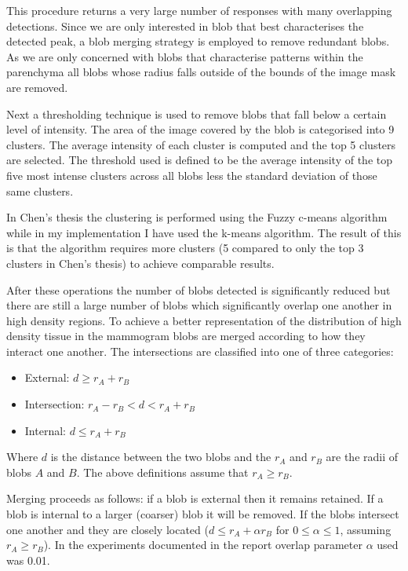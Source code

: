This procedure returns a very large number of responses with many overlapping detections. Since we are only interested in blob that best characterises the detected peak, a blob merging strategy is employed to remove redundant blobs. As we are only concerned with blobs that characterise patterns within the parenchyma all blobs whose radius falls outside of the bounds of the image mask are removed. 

Next a thresholding technique is used to remove blobs that fall below a certain level of intensity. The area of the image covered by the blob is categorised into 9 clusters. The average intensity of each cluster is computed and the top 5 clusters are selected. The threshold used is defined to be the average intensity of the top five most intense clusters across all blobs less the standard deviation of those same clusters. 

In Chen's thesis the clustering is performed using the Fuzzy c-means algorithm while in my implementation I have used the k-means algorithm. The result of this is that the algorithm requires more clusters (5 compared to only the top 3 clusters in Chen's thesis) to achieve comparable results.

After these operations the number of blobs detected is significantly reduced but there are still a large number of blobs which significantly overlap one another in high density regions. To achieve a better representation of the distribution of high density tissue in the mammogram blobs are merged according to how they interact one another. The intersections are classified into one of three categories:

\begin{itemize}
	\item External: $d \geq r_A + r_B$
	\item Intersection: $r_A - r_B < d < r_A + r_B$
	\item Internal: $d \leq r_A + r_B$
\end{itemize}

Where $d$ is the distance between the two blobs and the $r_A$ and $r_B$ are the radii of blobs $A$ and $B$. The above definitions assume that $r_A \geq r_B$.

Merging proceeds as follows: if a blob is external then it remains retained. If a blob is internal to a larger (coarser) blob it will be removed. If the blobs intersect one another and they are closely located ($d \leq r_A + \alpha r_B$ for $0 \leq \alpha \leq 1$, assuming $r_A \geq r_B$). In the experiments documented in the report overlap parameter $\alpha$ used was 0.01. 


